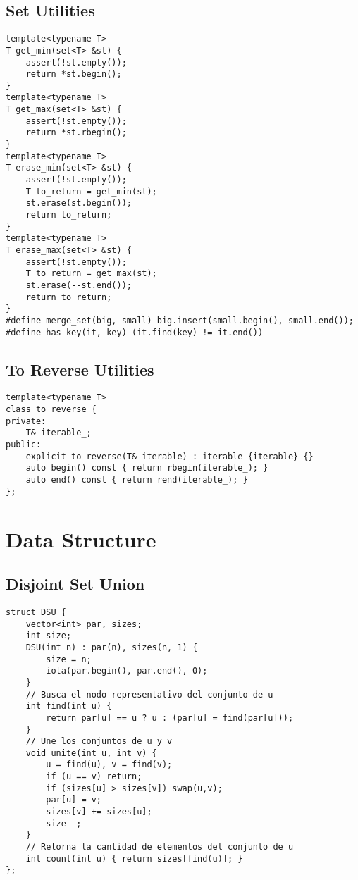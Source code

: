 \documentclass[10pt,letterpaper,twocolumn,twosided]{article}
\begin{document}
\subsection{Set Utilities}
\begin{lstlisting}
template<typename T>
T get_min(set<T> &st) {
    assert(!st.empty());
    return *st.begin();
}
template<typename T>
T get_max(set<T> &st) {
    assert(!st.empty());
    return *st.rbegin();
}
template<typename T>
T erase_min(set<T> &st) {
    assert(!st.empty());
    T to_return = get_min(st);
    st.erase(st.begin());
    return to_return;
}
template<typename T>
T erase_max(set<T> &st) {
    assert(!st.empty());
    T to_return = get_max(st);
    st.erase(--st.end());
    return to_return;
}
#define merge_set(big, small) big.insert(small.begin(), small.end());
#define has_key(it, key) (it.find(key) != it.end())
\end{lstlisting}

\subsection{To Reverse Utilities}
\begin{lstlisting}
template<typename T>
class to_reverse {
private:
    T& iterable_;
public:
    explicit to_reverse(T& iterable) : iterable_{iterable} {}
    auto begin() const { return rbegin(iterable_); }
    auto end() const { return rend(iterable_); }
};
\end{lstlisting}


\section{Data Structure}

\subsection{Disjoint Set Union}
\begin{lstlisting}
struct DSU {
    vector<int> par, sizes;
    int size;
    DSU(int n) : par(n), sizes(n, 1) {
        size = n;
        iota(par.begin(), par.end(), 0);
    }
    // Busca el nodo representativo del conjunto de u
    int find(int u) {
        return par[u] == u ? u : (par[u] = find(par[u]));
    }
    // Une los conjuntos de u y v
    void unite(int u, int v) {
        u = find(u), v = find(v);
        if (u == v) return;
        if (sizes[u] > sizes[v]) swap(u,v);
        par[u] = v;
        sizes[v] += sizes[u];
        size--;
    }
    // Retorna la cantidad de elementos del conjunto de u
    int count(int u) { return sizes[find(u)]; }
};
\end{lstlisting}
\end{document}
